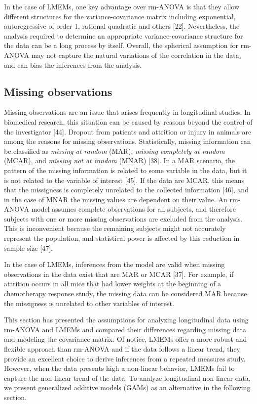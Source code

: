 \documentclass[
]{article}
\begin{document}
In the case of LMEMs, one key advantage over rm-ANOVA is that they allow different structures for the variance-covariance matrix including exponential, autoregressive of order 1, rational quadratic and others {[}22{]}. Nevertheless, the analysis required to determine an appropriate variance-covariance structure for the data can be a long process by itself. Overall, the spherical assumption for rm-ANOVA may not capture the natural variations of the correlation in the data, and can bias the inferences from the analysis.

\hypertarget{missing-observations}{%
\subsection{Missing observations}\label{missing-observations}}

Missing observations are an issue that arises frequently in longitudinal studies. In biomedical research, this situation can be caused by reasons beyond the control of the investigator {[}44{]}. Dropout from patients and attrition or injury in animals are among the reasons for missing observations. Statistically, missing information can be classified as \emph{missing at random} (MAR), \emph{missing completely at random} (MCAR), and \emph{missing not at random} (MNAR) {[}38{]}. In a MAR scenario, the pattern of the missing information is related to some variable in the data, but it is not related to the variable of interest {[}45{]}. If the data are MCAR, this means that the missigness is completely unrelated to the collected information {[}46{]}, and in the case of MNAR the missing values are dependent on their value. An rm-ANOVA model assumes complete observations for all subjects, and therefore subjects with one or more missing observations are excluded from the analysis. This is inconvenient because the remaining subjects might not accurately represent the population, and statistical power is affected by this reduction in sample size {[}47{]}.

In the case of LMEMs, inferences from the model are valid when missing observations in the data exist that are MAR or MCAR {[}37{]}. For example, if attrition occurs in all mice that had lower weights at the beginning of a chemotherapy response study, the missing data can be considered MAR because the missigness is unrelated to other variables of interest.

This section has presented the assumptions for analyzing longitudinal data using rm-ANOVA and LMEMs and compared their differences regarding missing data and modeling the covariance matrix. Of notice, LMEMs offer a more robust and flexible approach than rm-ANOVA and if the data follows a linear trend, they provide an excellent choice to derive inferences from a repeated measures study. However, when the data presents high a non-linear behavior, LMEMs fail to capture the non-linear trend of the data. To analyze longitudinal non-linear data, we present generalized additive models (GAMs) as an alternative in the following section.
\end{document}
